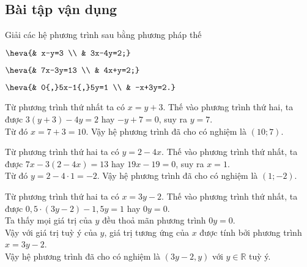 \subsection{Bài tập vận dụng}
\begin{bt}
	Giải các hệ phương trình sau bằng phương pháp thế
	\begin{listEX}[3]
	\item $\heva{& x-y=3 \\ & 3x-4y=2;}$
	\item $\heva{& 7x-3y=13 \\ & 4x+y=2;}$
	\item $\heva{& 0{,}5x-1{,}5y=1 \\ & -x+3y=2.}$
	\end{listEX}
	\loigiai
	{
	\begin{listEX}[1]
	\item Từ phương trình thứ nhất ta có $x=y+3$. Thế vào phương trình thứ hai, ta được $3(y+3)-4y=2$ hay $-y+7=0$, suy ra $y=7$.\\
	Từ đó $x=7+3=10$. Vậy hệ phương trình đã cho có nghiệm là $(10;7)$.
	\item Từ phương trình thứ hai ta có $y=2-4x$. Thế vào phương trình thứ nhất, ta được $7x-3(2-4x)=13$ hay $19x-19=0$, suy ra $x=1$.\\
	Từ đó $y=2-4\cdot 1=-2$. Vậy hệ phương trình đã cho có nghiệm là $(1;-2)$.
	\item Từ phương trình thứ hai ta có $x=3y-2$. Thế vào phương trình thứ nhất, ta được $0{,}5\cdot(3y-2)-1{,}5y=1$ hay $0y=0$.\\
	Ta thấy mọi giá trị của $y$ đều thoả mãn phương trình $0y=0$.\\
	Vậy với giá trị tuỳ ý của $y$, giá trị tương ứng của $x$ được tính bởi phương trình $x=3y-2$.\\
	Vậy hệ phương trình đã cho có nghiệm là $(3y-2,y)$ với $y\in\mathbb{R}$ tuỳ ý.
	\end{listEX}
	}
\end{bt}
